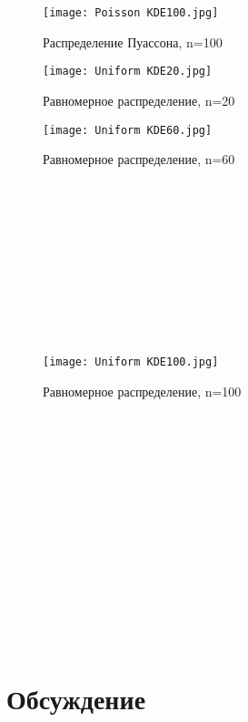\documentclass{article}
\begin{document}
\begin{figure}[!ht]
\begin{center}
\texttt{[image: Poisson KDE100.jpg]}
\caption{Распределение Пуассона, n=100}\label{figure4}
\end{center}
\end{figure}

\begin{figure}[!ht]
\begin{center}
\texttt{[image: Uniform KDE20.jpg]}
\caption{Равномерное распределение, n=20}\label{figure5}
\end{center}
\end{figure}

\begin{figure}[!ht]
\begin{center}
\texttt{[image: Uniform KDE60.jpg]}
\caption{Равномерное распределение, n=60}\label{figure5}
\end{center}
\end{figure}

~\\
~\\
~\\
~\\
~\\
~\\
~\\
~\\
~\\

\begin{figure}[!ht]
\begin{center}
\texttt{[image: Uniform KDE100.jpg]}
\caption{Равномерное распределение, n=100}\label{figure5}
\end{center}
\end{figure}

~\\
~\\
~\\
~\\
~\\
~\\
~\\
~\\
~\\
~\\
~\\
~\\
~\\
\newpage

\section{Обсуждение}
\end{document}
